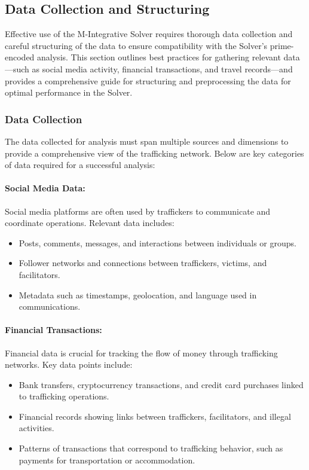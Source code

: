 \documentclass[%
 preprint, linenumbers,
 amsmath,amssymb,
 aps, physrev,
]{revtex4-2}
\begin{document}
\subsection{Data Collection and Structuring}

Effective use of the M-Integrative Solver requires thorough data collection and careful structuring of the data to ensure compatibility with the Solver’s prime-encoded analysis. This section outlines best practices for gathering relevant data—such as social media activity, financial transactions, and travel records—and provides a comprehensive guide for structuring and preprocessing the data for optimal performance in the Solver.

\subsubsection{Data Collection}

The data collected for analysis must span multiple sources and dimensions to provide a comprehensive view of the trafficking network. Below are key categories of data required for a successful analysis:

\paragraph{Social Media Data:}
Social media platforms are often used by traffickers to communicate and coordinate operations. Relevant data includes:
\begin{itemize}
    \item Posts, comments, messages, and interactions between individuals or groups.
    \item Follower networks and connections between traffickers, victims, and facilitators.
    \item Metadata such as timestamps, geolocation, and language used in communications.
\end{itemize}

\paragraph{Financial Transactions:}
Financial data is crucial for tracking the flow of money through trafficking networks. Key data points include:
\begin{itemize}
    \item Bank transfers, cryptocurrency transactions, and credit card purchases linked to trafficking operations.
    \item Financial records showing links between traffickers, facilitators, and illegal activities.
    \item Patterns of transactions that correspond to trafficking behavior, such as payments for transportation or accommodation.
\end{itemize}
\end{document}
